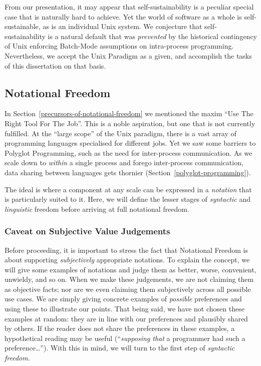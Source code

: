 \documentclass[ twoside,openright,titlepage,numbers=noenddot,headinclude,footinclude,cleardoublepage=empty,abstract=on,
                BCOR=5mm,paper=a4,fontsize=11pt
                ]{scrreprt}
\theoremstyle{definition}
\begin{document}
From our presentation, it may appear that self-sustainability is a
peculiar special case that is naturally hard to achieve. Yet the world
of software as a whole is self-sustainable, as is an individual Unix
system. We conjecture that self-sustainability is a natural default that
was \emph{prevented} by the historical contingency of Unix enforcing
Batch-Mode assumptions on intra-process programming. Nevertheless, we
accept the Unix Paradigm as a given, and accomplish the tasks of this
dissertation on that basis.

\hypertarget{notational-freedom}{\subsection{Notational Freedom}\label{notational-freedom}}

In Section~\ref{precursors-of-notational-freedom} we mentioned the maxim
``Use The Right Tool For The Job''. This is a noble aspiration, but one
that is not currently fulfilled. At the ``large scope'' of the Unix
paradigm, there is a vast array of programming languages specialised for
different jobs. Yet we saw some barriers to Polyglot Programming, such
as the need for inter-process communication. As we scale down to
\emph{within} a single process and forego inter-process communication,
data sharing between languages gets thornier
(Section~\ref{polyglot-programming}).

The ideal is where a component at any scale can be expressed in a
\emph{notation} that is particularly suited to it. Here, we will define
the lesser stages of \emph{syntactic} and \emph{linguistic} freedom
before arriving at full notational freedom.

\hypertarget{caveat-on-subjective-value-judgements}{\subsubsection{Caveat on Subjective Value
Judgements}\label{caveat-on-subjective-value-judgements}}

Before proceeding, it is important to stress the fact that Notational
Freedom is about supporting \emph{subjectively} appropriate notations.
To explain the concept, we will give some examples of notations and
judge them as better, worse, convenient, unwieldy, and so on. When we
make these judgements, we are not claiming them as objective facts; nor
are we even claiming them subjectively across all possible use cases. We
are simply giving concrete examples of \emph{possible} preferences and
using these to illustrate our points. That being said, we have not
chosen these examples at random: they are in line with our preferences
and plausibly shared by others. If the reader does not share the
preferences in these examples, a hypothetical reading may be useful
(``\emph{supposing that} a programmer had such a preference\ldots'').
With this in mind, we will turn to the first step of \emph{syntactic
freedom.}
\end{document}
